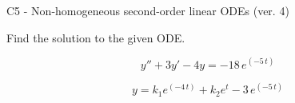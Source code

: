 \begin{exercise}
  \begin{exerciseTitle}C5 - Non-homogeneous second-order linear ODEs (ver. 4)\end{exerciseTitle}
  \begin{exerciseStatement}
    
Find the solution to the given ODE.

    
\[y''+3y'-4y = -18 \, e^{\left(-5 \, t\right)}\]

  \end{exerciseStatement}
  \begin{exerciseAnswer}
    
\[y= k_{1} e^{\left(-4 \, t\right)} + k_{2} e^{t} - 3 \, e^{\left(-5 \, t\right)}\]

  \end{exerciseAnswer}
\end{exercise}
